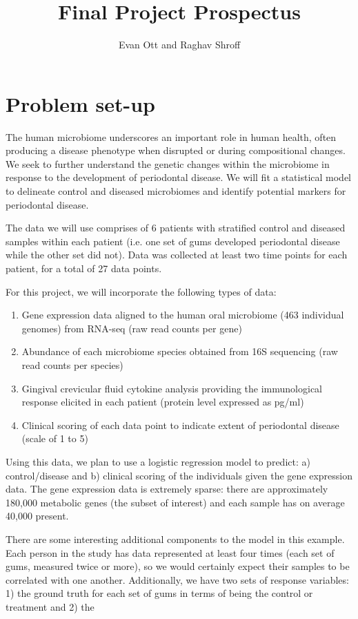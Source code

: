 \documentclass{article}
\title{\vspace{-6ex}Final Project Prospectus\vspace{-2ex}}
\author{Evan Ott and Raghav Shroff\vspace{-2ex}}
\begin{document}
\maketitle

\section{Problem set-up}
The human microbiome underscores an important role in human health, often producing a disease phenotype when disrupted or during compositional changes. We seek to further understand the genetic changes within the microbiome in response to the development of periodontal disease. We will fit a statistical model to delineate control and diseased microbiomes and identify potential markers for periodontal disease. 

The data we will use comprises of 6 patients with stratified control and diseased samples within each patient (i.e. one set of gums developed periodontal disease while the other set did not). Data was collected at least two time points for each patient, for a total of 27 data points.

For this project, we will incorporate the following types of data:
\begin{enumerate}[(1)]
\item Gene expression data aligned to the human oral microbiome (463 individual genomes) from RNA-seq (raw read counts per gene)
\item Abundance of each microbiome species obtained from 16S sequencing (raw read counts per species)
\item Gingival crevicular fluid cytokine analysis providing the immunological response elicited in each patient (protein level expressed as pg/ml)
\item Clinical scoring of each data point to indicate extent of periodontal disease (scale of 1 to 5)
\end{enumerate}


Using this data, we plan to use a logistic regression model to predict: a) control/disease and b) clinical scoring of the individuals given the gene expression data. The gene expression data is extremely sparse: there are approximately 180,000 metabolic genes (the subset of interest) and each sample has on average 40,000 present.

There are some interesting additional components to the model in this example. Each person in the study has data represented at least four times (each set of gums, measured twice or more), so we would certainly expect their samples
to be correlated with one another. Additionally, we have two sets of response variables: 1) the ground truth for each set of gums in terms of being the control or treatment and 2) the 


%
%
\end{document}
